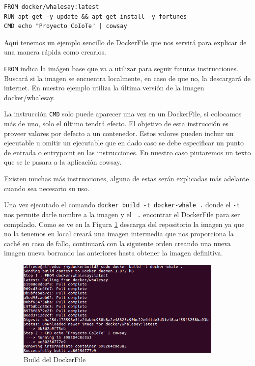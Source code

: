 \begin{verbatim}
FROM docker/whalesay:latest
RUN apt-get -y update && apt-get install -y fortunes
CMD echo "Proyecto CoIoTe" | cowsay
\end{verbatim}

Aquí tenemos un ejemplo sencillo de DockerFile que nos servirá para explicar de una manera rápida como crearlos. 

\texttt{FROM} indica la imágen base que va a utilizar para seguir futuras instrucciones. Buscará si la imagen se encuentra localmente, en caso de que no, la descargará de internet. En nuestro ejemplo utiliza la última versión de la imagen docker/whalesay.

La instrucción \texttt{CMD} solo puede aparecer una vez en un DockerFile, si colocamos más de uno, solo el último tendrá efecto. El objetivo de esta instrucción es proveer valores por defecto a un contenedor. Estos valores pueden incluir un ejecutable u omitir un ejecutable que en dado caso se debe especificar un punto de entrada o entrypoint en las instrucciones. En nuestro caso pintaremos un texto que se le pasara a la aplicación cowsay.

Existen muchas más instrucciones, alguna de estas serán explicadas más adelante cuando sea necesario su uso. 

Una vez ejecutado el comando \texttt{docker build -t docker-whale .} donde el \texttt{-t} nos permite darle nombre a la imagen y el \texttt{ .} encontrar el DockerFile para ser compilado. Como se ve en la Figura \ref{Build:BuildDockerFile} descarga del repositorio la imagen ya que no la tenemos en local creará una imagen intermedia que nos proporciona la caché en caso de fallo, continuará con la siguiente orden creando una nueva imagen nueva borrando las anteriores hasta obtener la imagen definitiva. 
 
\begin{figure}[htb]
\begin{center}
\includegraphics[width=0.90\textwidth]{./setup/DockerBuildWale}
\caption{Build del DockerFile}
\label{Build:BuildDockerFile}
\end{center}
\end{figure}
 
